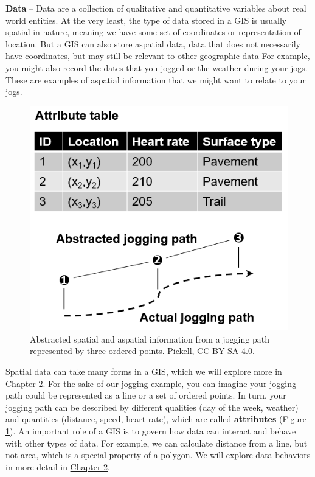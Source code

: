 \documentclass[
]{book}
\begin{document}
\textbf{Data} -- Data are a collection of qualitative and quantitative variables about real world entities. At the very least, the type of data stored in a GIS is usually spatial in nature, meaning we have some set of coordinates or representation of location. But a GIS can also store aspatial data, data that does not necessarily have coordinates, but may still be relevant to other geographic data For example, you might also record the dates that you jogged or the weather during your jogs. These are examples of aspatial information that we might want to relate to your jogs.

\begin{figure}
\includegraphics[width=0.75\linewidth]{images/01-jogging-path} \caption{Abstracted spatial and aspatial information from a jogging path represented by three ordered points. Pickell, CC-BY-SA-4.0.}\label{fig:1-jogging-path}
\end{figure}

Spatial data can take many forms in a GIS, which we will explore more in \href{./mapping-data.html}{Chapter 2}. For the sake of our jogging example, you can imagine your jogging path could be represented as a line or a set of ordered points. In turn, your jogging path can be described by different qualities (day of the week, weather) and quantities (distance, speed, heart rate), which are called \textbf{attributes} (Figure \ref{fig:1-jogging-path}). An important role of a GIS is to govern how data can interact and behave with other types of data. For example, we can calculate distance from a line, but not area, which is a special property of a polygon. We will explore data behaviors in more detail in \href{./mapping-data.html}{Chapter 2}.
\end{document}
